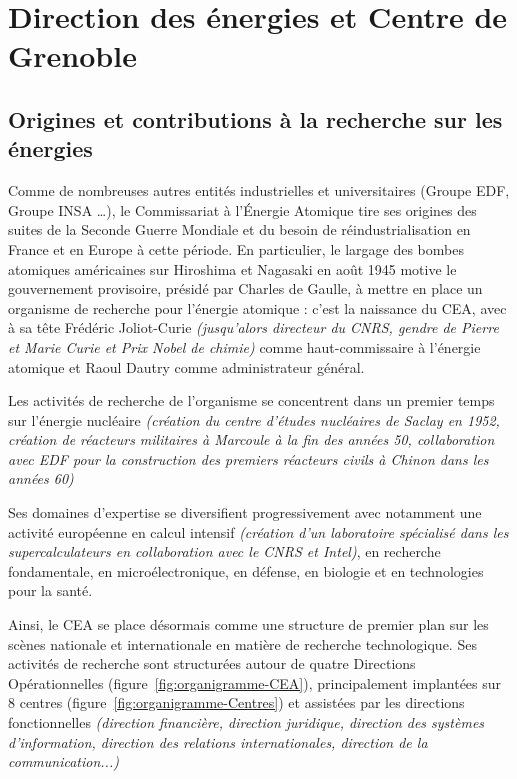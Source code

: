 \chapter{Direction des énergies et Centre de Grenoble}\label{ch:direction-des-energies-et-centre-de-grenoble}


\section{Origines et contributions à la recherche sur les énergies}\label{sec:origines-et-contributions-a-la-recherche-sur-les-energies}

Comme de nombreuses autres entités industrielles et universitaires (Groupe EDF, Groupe INSA \ldots), le Commissariat à l'Énergie Atomique
tire ses origines des suites de la Seconde Guerre Mondiale et du besoin de réindustrialisation en France et en Europe à cette période.
En particulier, le largage des bombes atomiques américaines sur Hiroshima et Nagasaki en août 1945 motive le gouvernement provisoire, présidé par Charles de Gaulle, à mettre en place un organisme de recherche pour l'énergie atomique : c'est la naissance du \gls{CEA}, avec à sa tête Frédéric Joliot-Curie \textit{(jusqu'alors directeur du CNRS, gendre de Pierre et Marie Curie et Prix Nobel de chimie)} comme haut-commissaire à l'énergie atomique et Raoul Dautry comme administrateur général.

    Les activités de recherche de l'organisme se concentrent dans un premier temps sur l'énergie nucléaire \textit{(création du centre d'études nucléaires de Saclay en 1952, création de réacteurs militaires à Marcoule à la fin des années 50, collaboration avec EDF pour la construction des premiers réacteurs civils à Chinon dans les années 60)}\cite{wiki_CEA}

    Ses domaines d'expertise se diversifient progressivement avec notamment une activité européenne en calcul intensif \textit{(création d'un laboratoire spécialisé dans les supercalculateurs en collaboration avec le CNRS et Intel)}, en recherche fondamentale, en microélectronique, en défense, en biologie et en technologies pour la santé.

    Ainsi, le \gls{CEA} se place désormais comme une structure de premier plan sur les scènes nationale et internationale en matière de recherche technologique.
    Ses activités de recherche sont structurées autour de quatre Directions Opérationnelles (figure~\ref{fig:organigramme-CEA}), principalement implantées sur 8 centres (figure~\ref{fig:organigramme-Centres}) et assistées par les directions fonctionnelles \textit{(direction financière, direction juridique, direction des systèmes d'information, direction des relations internationales, direction de la communication...)}

